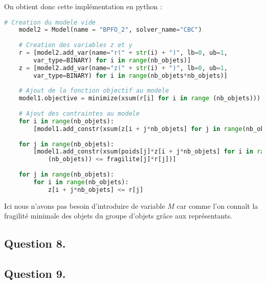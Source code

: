 On obtient donc cette implémentation en python :\vspace{4pt}

\begin{lstlisting}[language=Python]
    # Creation du modele vide
    model2 = Model(name = "BPFO_2", solver_name="CBC")  
    
    # Creation des variables z et y
    r = [model2.add_var(name="r(" + str(i) + ")", lb=0, ub=1, 
        var_type=BINARY) for i in range(nb_objets)]
    z = [model2.add_var(name="z(" + str(i) + ")", lb=0, ub=1, 
        var_type=BINARY) for i in range(nb_objets*nb_objets)]
    
    # Ajout de la fonction objectif au modele
    model1.objective = minimize(xsum(r[i] for i in range (nb_objets)))
    
    # Ajout des contraintes au modele
    for i in range(nb_objets):
        [model1.add_constr(xsum(z[i + j*nb_objets] for j in range(nb_objets)) == 1)]
    
    for j in range(nb_objets):
        [model1.add_constr(xsum(poids[j]*z[i + j*nb_objets] for i in range 
            (nb_objets)) <= fragilite[j]*r[j])]
    
    for j in range(nb_objets):
        for i in range(nb_objets):
            z[i + j*nb_objets] <= r[j]
\end{lstlisting}

Ici nous n'avons pas besoin d'introduire de variable $M$ car comme l'on connaît la fragilité minimale des objets du groupe d'objets grâce aux représentants.\vspace{12pt} 

\subsection*{Question 8.}

\subsection*{Question 9.}